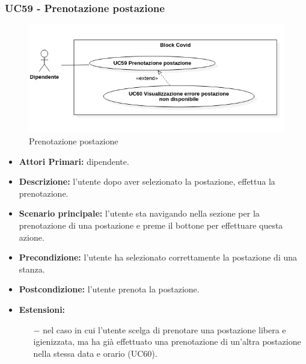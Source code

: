 \subsubsection{ UC59 - Prenotazione postazione }
\begin{figure}[H]
	\centering
	\includegraphics[width=15cm]{res/images/UC59-60.png}
	\caption{Prenotazione postazione}
	\label{fig:Prenotazione postazione}
\end{figure}
\begin{itemize}
	\item\textbf{Attori Primari:} dipendente.
	\item\textbf{Descrizione:} l’utente dopo aver selezionato la postazione, effettua la prenotazione. 
	\item\textbf{Scenario principale:} l’utente sta navigando nella sezione per la prenotazione di una postazione
	e preme il bottone per effettuare questa azione.
	\item\textbf{Precondizione:} l’utente ha selezionato correttamente la postazione di una stanza.
	\item\textbf{Postcondizione:} l'utente prenota la postazione.
	\item\textbf{Estensioni:}
	\begin{itemize}
		\item[$-$] nel caso in cui l'utente scelga di prenotare una postazione libera e igienizzata, ma ha già effettuato una prenotazione di un'altra postazione nella stessa data e orario (UC60).
	\end{itemize}
\end{itemize}
